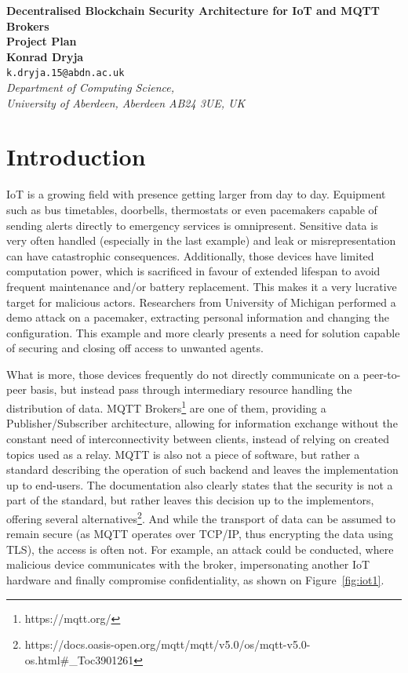 \documentclass[a4paper,12pt]{article}
\begin{document}
\begin{center}
{\Large\bf{Decentralised Blockchain Security Architecture for IoT and MQTT Brokers}} \\
      \vspace{5.0mm}
{\Large\bf{Project Plan}} \\
      \vspace{8mm}
      {\large\bf{Konrad Dryja}}  \\
      \vspace{5.0mm}
       {\tt k.dryja.15@abdn.ac.uk} \\
      \vspace{5.0mm}
      {\em Department of Computing Science,\\
       University of Aberdeen, Aberdeen AB24 3UE, UK} 
\end{center}


\section*{Introduction}

IoT is a growing field with presence getting larger from day to day. Equipment such as bus timetables, doorbells, thermostats or even pacemakers capable of sending alerts directly to emergency services is omnipresent. Sensitive data is very often handled (especially in the last example) and leak or misrepresentation can have catastrophic consequences. Additionally, those devices have limited computation power, which is sacrificed in favour of extended lifespan to avoid frequent maintenance and/or battery replacement. This makes it a very lucrative target for malicious actors. Researchers from University of Michigan performed a demo attack on a pacemaker, extracting personal information and changing the configuration.\cite{4531149} This example and more clearly presents a need for solution capable of securing and closing off access to unwanted agents.

What is more, those devices frequently do not directly communicate on a peer-to-peer basis, but instead pass through intermediary resource handling the distribution of data. MQTT Brokers\footnote{https://mqtt.org/} are one of them, providing a Publisher/Subscriber architecture, allowing for information exchange without the constant need of interconnectivity between clients, instead of relying on created topics used as a relay. MQTT is also not a piece of software, but rather a standard describing the operation of such backend and leaves the implementation up to end-users. The documentation also clearly states that the security is not a part of the standard, but rather leaves this decision up to the implementors, offering several alternatives\footnote{https://docs.oasis-open.org/mqtt/mqtt/v5.0/os/mqtt-v5.0-os.html\#\_Toc3901261}. And while the transport of data can be assumed to remain secure (as MQTT operates over TCP/IP, thus encrypting the data using TLS), the access is often not. For example, an attack could be conducted, where malicious device communicates with the broker, impersonating another IoT hardware and finally compromise confidentiality, as shown on Figure~\ref{fig:iot1}.
\end{document}
